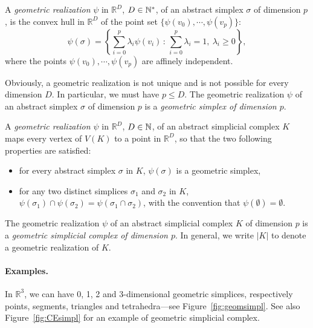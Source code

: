 \begin{defin}
A {\em geometric realization} $\psi$ in $\mathbb{R}^{D}$, $D\in\mathbb{N}^*$, of an abstract simplex $\sigma$ of dimension $p$, 
is the convex hull in $\mathbb{R}^{D}$ of the point set 
$\{\psi(v_{0}),\cdots,\psi(v_{p})\}$: 
$$\psi(\sigma)=\left\{\sum_{i=0}^{p}\lambda_{i}\psi(v_{i})\,:\,\sum_{i=0}^{p}\lambda_{i}=1,\ \lambda_{i}\ge 0\right\},$$
where the points $\psi(v_{0}),\cdots,\psi(v_{p})$ are affinely independent.
\end{defin}

Obviously, a geometric realization is not unique and is not possible for every dimension $D$. In particular, we must have $p\leq D$.
The geometric realization $\psi$ of an abstract simplex $\sigma$ of dimension $p$ is a {\em geometric simplex of dimension $p$}. 

\begin{defin}
A {\em geometric realization $\psi$} in $\mathbb{R}^{D}$, $D\in\mathbb{N}$, of an abstract simplicial complex $K$ %
maps every vertex of $V(K)$ to a point in $\mathbb{R}^{D}$, so that the two following properties are satisfied: 
\begin{itemize} 
\item for every abstract simplex $\sigma$ in $K$, $\psi(\sigma)$ is a geometric simplex, 
\item for any two distinct simplices $\sigma_{1}$ and $\sigma_{2}$ in $K$, %
$\psi(\sigma_{1})\cap\psi(\sigma_{2})=\psi(\sigma_{1}\cap\sigma_{2})$, with the convention that $\psi(\emptyset)=\emptyset$. 
\end{itemize}

\end{defin}

The geometric realization $\psi$ of an abstract simplicial complex $K$ of dimension $p$ is a {\em geometric simplicial complex of dimension $p$}.
In general, we write $|K|$ to denote a geometric realization of $K$.

\paragraph*{Examples.} In $\mathbb{R}^{3}$, we can have 0, 1, 2 and 3-dimensional geometric simplices, 
respectively points, segments, triangles and tetrahedra---see Figure~\ref{fig:geomsimpl}.
See also Figure~\ref{fig:CEsimpl} for an example of geometric simplicial complex. 


